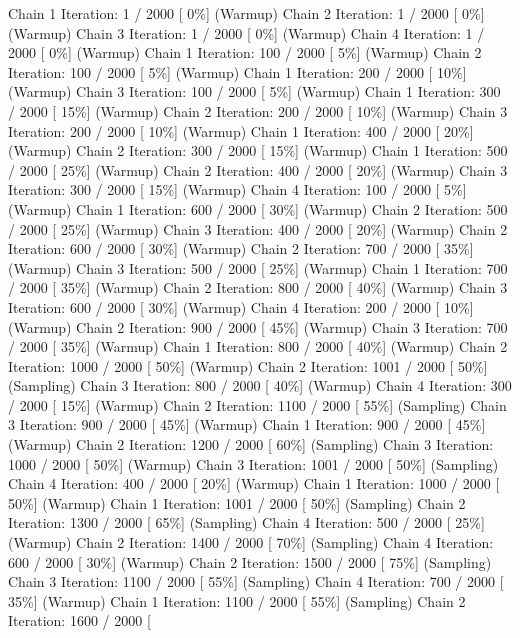\documentclass[
]{article}
\begin{document}
Chain 1 Iteration: 1 / 2000 {[} 0\%{]} (Warmup) Chain 2 Iteration: 1 /
2000 {[} 0\%{]} (Warmup) Chain 3 Iteration: 1 / 2000 {[} 0\%{]} (Warmup)
Chain 4 Iteration: 1 / 2000 {[} 0\%{]} (Warmup) Chain 1 Iteration: 100 /
2000 {[} 5\%{]} (Warmup) Chain 2 Iteration: 100 / 2000 {[} 5\%{]}
(Warmup) Chain 1 Iteration: 200 / 2000 {[} 10\%{]} (Warmup) Chain 3
Iteration: 100 / 2000 {[} 5\%{]} (Warmup) Chain 1 Iteration: 300 / 2000
{[} 15\%{]} (Warmup) Chain 2 Iteration: 200 / 2000 {[} 10\%{]} (Warmup)
Chain 3 Iteration: 200 / 2000 {[} 10\%{]} (Warmup) Chain 1 Iteration:
400 / 2000 {[} 20\%{]} (Warmup) Chain 2 Iteration: 300 / 2000 {[}
15\%{]} (Warmup) Chain 1 Iteration: 500 / 2000 {[} 25\%{]} (Warmup)
Chain 2 Iteration: 400 / 2000 {[} 20\%{]} (Warmup) Chain 3 Iteration:
300 / 2000 {[} 15\%{]} (Warmup) Chain 4 Iteration: 100 / 2000 {[} 5\%{]}
(Warmup) Chain 1 Iteration: 600 / 2000 {[} 30\%{]} (Warmup) Chain 2
Iteration: 500 / 2000 {[} 25\%{]} (Warmup) Chain 3 Iteration: 400 / 2000
{[} 20\%{]} (Warmup) Chain 2 Iteration: 600 / 2000 {[} 30\%{]} (Warmup)
Chain 2 Iteration: 700 / 2000 {[} 35\%{]} (Warmup) Chain 3 Iteration:
500 / 2000 {[} 25\%{]} (Warmup) Chain 1 Iteration: 700 / 2000 {[}
35\%{]} (Warmup) Chain 2 Iteration: 800 / 2000 {[} 40\%{]} (Warmup)
Chain 3 Iteration: 600 / 2000 {[} 30\%{]} (Warmup) Chain 4 Iteration:
200 / 2000 {[} 10\%{]} (Warmup) Chain 2 Iteration: 900 / 2000 {[}
45\%{]} (Warmup) Chain 3 Iteration: 700 / 2000 {[} 35\%{]} (Warmup)
Chain 1 Iteration: 800 / 2000 {[} 40\%{]} (Warmup) Chain 2 Iteration:
1000 / 2000 {[} 50\%{]} (Warmup) Chain 2 Iteration: 1001 / 2000 {[}
50\%{]} (Sampling) Chain 3 Iteration: 800 / 2000 {[} 40\%{]} (Warmup)
Chain 4 Iteration: 300 / 2000 {[} 15\%{]} (Warmup) Chain 2 Iteration:
1100 / 2000 {[} 55\%{]} (Sampling) Chain 3 Iteration: 900 / 2000 {[}
45\%{]} (Warmup) Chain 1 Iteration: 900 / 2000 {[} 45\%{]} (Warmup)
Chain 2 Iteration: 1200 / 2000 {[} 60\%{]} (Sampling) Chain 3 Iteration:
1000 / 2000 {[} 50\%{]} (Warmup) Chain 3 Iteration: 1001 / 2000 {[}
50\%{]} (Sampling) Chain 4 Iteration: 400 / 2000 {[} 20\%{]} (Warmup)
Chain 1 Iteration: 1000 / 2000 {[} 50\%{]} (Warmup) Chain 1 Iteration:
1001 / 2000 {[} 50\%{]} (Sampling) Chain 2 Iteration: 1300 / 2000 {[}
65\%{]} (Sampling) Chain 4 Iteration: 500 / 2000 {[} 25\%{]} (Warmup)
Chain 2 Iteration: 1400 / 2000 {[} 70\%{]} (Sampling) Chain 4 Iteration:
600 / 2000 {[} 30\%{]} (Warmup) Chain 2 Iteration: 1500 / 2000 {[}
75\%{]} (Sampling) Chain 3 Iteration: 1100 / 2000 {[} 55\%{]} (Sampling)
Chain 4 Iteration: 700 / 2000 {[} 35\%{]} (Warmup) Chain 1 Iteration:
1100 / 2000 {[} 55\%{]} (Sampling) Chain 2 Iteration: 1600 / 2000 {[}
\end{document}
